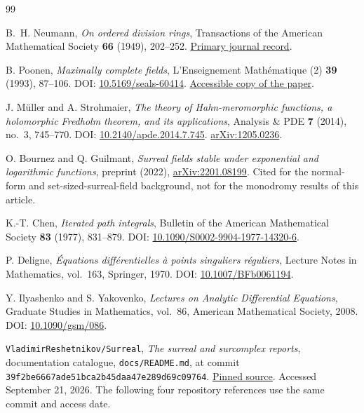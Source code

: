\documentclass[11pt,letterpaper]{article}
\numberwithin{equation}{section}
\theoremstyle{definition}
\theoremstyle{remark}
\newcommand{\commit}{\texttt{39f2be6667ade51bca2b45daa47e289d69c09764}}
\begin{document}
\begin{thebibliography}{99}
\small\raggedright
{}

B.~H. Neumann,
\emph{On ordered division rings},
Transactions of the American Mathematical Society \textbf{66} (1949),
202--252.
\href{https://www.jstor.org/stable/1990552}{Primary journal record}.

B. Poonen,
\emph{Maximally complete fields},
L'Enseignement Math\'ematique (2) \textbf{39} (1993), 87--106.
DOI: \href{https://doi.org/10.5169/seals-60414}{10.5169/seals-60414}.
\href{https://math.stanford.edu/~conrad/Perfseminar/refs/poonencomplete.pdf}{Accessible copy of the paper}.

J. M\"uller and A. Strohmaier,
\emph{The theory of Hahn-meromorphic functions, a holomorphic Fredholm
theorem, and its applications},
Analysis \& PDE \textbf{7} (2014), no.~3, 745--770.
DOI: \href{https://doi.org/10.2140/apde.2014.7.745}{10.2140/apde.2014.7.745}.
\href{https://arxiv.org/abs/1205.0236}{arXiv:1205.0236}.

O. Bournez and Q. Guilmant,
\emph{Surreal fields stable under exponential and logarithmic functions},
preprint (2022), \href{https://arxiv.org/abs/2201.08199}{arXiv:2201.08199}.
Cited for the normal-form and set-sized-surreal-field background, not for
the monodromy results of this article.

K.-T. Chen,
\emph{Iterated path integrals},
Bulletin of the American Mathematical Society \textbf{83} (1977),
831--879.
DOI: \href{https://doi.org/10.1090/S0002-9904-1977-14320-6}{10.1090/S0002-9904-1977-14320-6}.

P. Deligne,
\emph{\'Equations diff\'erentielles \`a points singuliers r\'eguliers},
Lecture Notes in Mathematics, vol.~163, Springer, 1970.
DOI: \href{https://doi.org/10.1007/BFb0061194}{10.1007/BFb0061194}.

Y. Ilyashenko and S. Yakovenko,
\emph{Lectures on Analytic Differential Equations},
Graduate Studies in Mathematics, vol.~86, American Mathematical Society,
2008.
DOI: \href{https://doi.org/10.1090/gsm/086}{10.1090/gsm/086}.

\texttt{VladimirReshetnikov/Surreal},
\emph{The surreal and surcomplex reports}, documentation catalogue,
\texttt{docs/README.md}, at commit \commit.
\href{https://github.com/VladimirReshetnikov/Surreal/blob/39f2be6667ade51bca2b45daa47e289d69c09764/docs/README.md}{Pinned source}.
Accessed September 21, 2026. The following four repository references use
the same commit and access date.


\end{thebibliography}
\end{document}
